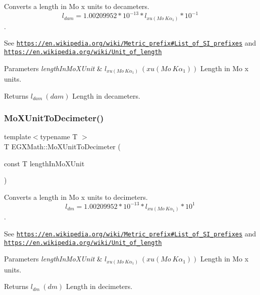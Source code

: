 Converts a length in Mo x units to decameters. \[ l_{dam}=1.00209952*10^{-13} * l_{xu(Mo\ K\alpha_1)} * 10^{-1} \]. 

See \href{https://en.wikipedia.org/wiki/Metric_prefix#List_of_SI_prefixes}{\tt https\+://en.\+wikipedia.\+org/wiki/\+Metric\+\_\+prefix\#\+List\+\_\+of\+\_\+\+S\+I\+\_\+prefixes} and \href{https://en.wikipedia.org/wiki/Unit_of_length}{\tt https\+://en.\+wikipedia.\+org/wiki/\+Unit\+\_\+of\+\_\+length} 
\begin{DoxyParams}{Parameters}
{\em length\+In\+Mo\+X\+Unit} & $ l_{xu(Mo\ K\alpha_1)}\ (xu(Mo\ K\alpha_1))$ Length in Mo x units. \\
\hline
\end{DoxyParams}
\begin{DoxyReturn}{Returns}
$ l_{dam}\ (dam)$ Length in decameters. 
\end{DoxyReturn}
\mbox{\label{group___e_g_x_math-_conversions-_length_conversions-_non-_s_i-_mo_x_unit-_s_i_ga986fd20a8a60d8eff54b0eca362518e4}} 
\subsubsection{\texorpdfstring{Mo\+X\+Unit\+To\+Decimeter()}{MoXUnitToDecimeter()}}
{\footnotesize\ttfamily template$<$typename T $>$ \\
T E\+G\+X\+Math\+::\+Mo\+X\+Unit\+To\+Decimeter (\begin{DoxyParamCaption}\item[{const T}]{length\+In\+Mo\+X\+Unit }\end{DoxyParamCaption})}



Converts a length in Mo x units to decimeters. \[ l_{dm}=1.00209952*10^{-13} * l_{xu(Mo\ K\alpha_1)} * 10^{1} \]. 

See \href{https://en.wikipedia.org/wiki/Metric_prefix#List_of_SI_prefixes}{\tt https\+://en.\+wikipedia.\+org/wiki/\+Metric\+\_\+prefix\#\+List\+\_\+of\+\_\+\+S\+I\+\_\+prefixes} and \href{https://en.wikipedia.org/wiki/Unit_of_length}{\tt https\+://en.\+wikipedia.\+org/wiki/\+Unit\+\_\+of\+\_\+length} 
\begin{DoxyParams}{Parameters}
{\em length\+In\+Mo\+X\+Unit} & $ l_{xu(Mo\ K\alpha_1)}\ (xu(Mo\ K\alpha_1))$ Length in Mo x units. \\
\hline
\end{DoxyParams}
\begin{DoxyReturn}{Returns}
$ l_{dm}\ (dm)$ Length in decimeters. 
\end{DoxyReturn}
\mbox{\label{group___e_g_x_math-_conversions-_length_conversions-_non-_s_i-_mo_x_unit-_s_i_ga063e533efef257dd481853b57712f0c6}} 
